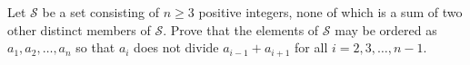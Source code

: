 Let $\mathcal{S}$ be a set consisting of $n \ge 3$ positive integers, none of which is a sum of two other distinct members of $\mathcal{S}$. Prove that the elements of $\mathcal{S}$ may be ordered as $a_1, a_2, \dots, a_n$ so that $a_i$ does not divide $a_{i - 1} + a_{i + 1}$ for all $i = 2, 3, \dots, n - 1$.